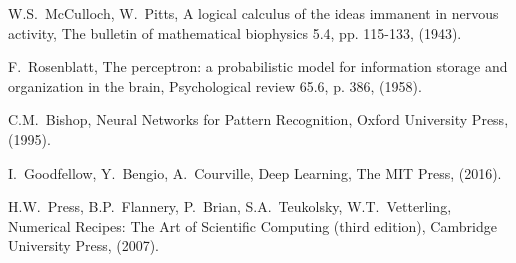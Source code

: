 \documentclass{book}
\begin{document}
\begin{thebibliography}{1}

W.S.~McCulloch, W.~Pitts,
A logical calculus of the ideas immanent in nervous activity,
The bulletin of mathematical biophysics 5.4, pp. 115-133, (1943).

F.~Rosenblatt,
The perceptron: a probabilistic model for information storage and organization in the brain,
Psychological review 65.6, p. 386, (1958).

C.M.~Bishop,
Neural Networks for Pattern Recognition,
Oxford University Press, (1995).

I.~Goodfellow, Y.~Bengio, A.~Courville,
Deep Learning, The MIT Press, (2016).

H.W.~Press, B.P.~Flannery, P.~Brian, S.A.~Teukolsky, W.T.~Vetterling,
Numerical Recipes: The Art of Scientific Computing (third edition),
Cambridge University Press, (2007).


\end{thebibliography}
\end{document}
